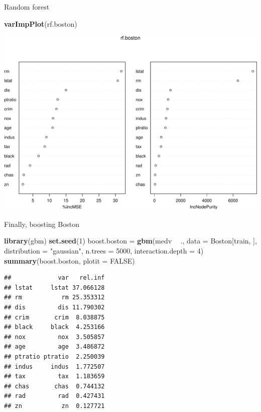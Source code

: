 \documentclass[ignorenonframetext,]{beamer}
\newenvironment{Shaded}{\begin{snugshade}}{\end{snugshade}}
\newcommand{\KeywordTok}[1]{\textcolor[rgb]{0.13,0.29,0.53}{\textbf{#1}}}
\newcommand{\DataTypeTok}[1]{\textcolor[rgb]{0.13,0.29,0.53}{#1}}
\newcommand{\DecValTok}[1]{\textcolor[rgb]{0.00,0.00,0.81}{#1}}
\newcommand{\StringTok}[1]{\textcolor[rgb]{0.31,0.60,0.02}{#1}}
\newcommand{\OtherTok}[1]{\textcolor[rgb]{0.56,0.35,0.01}{#1}}
\newcommand{\OperatorTok}[1]{\textcolor[rgb]{0.81,0.36,0.00}{\textbf{#1}}}
\newcommand{\NormalTok}[1]{#1}
\begin{document}
\begin{frame}[fragile]
\begin{block}{Random forest}
\begin{Shaded}
\begin{Highlighting}[]
\KeywordTok{varImpPlot}\NormalTok{(rf.boston)}
\end{Highlighting}
\end{Shaded}

\includegraphics{8TreesBEAMER_files/figure-beamer/unnamed-chunk-46-1.pdf}

\end{block}

\end{frame}

\begin{frame}[fragile]

\begin{block}{Finally, boosting Boston}

\begin{Shaded}
\begin{Highlighting}[]
\KeywordTok{library}\NormalTok{(gbm)}
\KeywordTok{set.seed}\NormalTok{(}\DecValTok{1}\NormalTok{)}
\NormalTok{boost.boston =}\StringTok{ }\KeywordTok{gbm}\NormalTok{(medv }\OperatorTok{~}\StringTok{ }\NormalTok{., }\DataTypeTok{data =}\NormalTok{ Boston[train, ], }\DataTypeTok{distribution =} \StringTok{"gaussian"}\NormalTok{, }
    \DataTypeTok{n.trees =} \DecValTok{5000}\NormalTok{, }\DataTypeTok{interaction.depth =} \DecValTok{4}\NormalTok{)}
\KeywordTok{summary}\NormalTok{(boost.boston, }\DataTypeTok{plotit =} \OtherTok{FALSE}\NormalTok{)}
\end{Highlighting}
\end{Shaded}

\begin{verbatim}
##             var   rel.inf
## lstat     lstat 37.066128
## rm           rm 25.353312
## dis         dis 11.790302
## crim       crim  8.038875
## black     black  4.253166
## nox         nox  3.505857
## age         age  3.486872
## ptratio ptratio  2.250039
## indus     indus  1.772507
## tax         tax  1.183659
## chas       chas  0.744132
## rad         rad  0.427431
## zn           zn  0.127721
\end{verbatim}

\end{block}

\end{frame}
\end{document}

